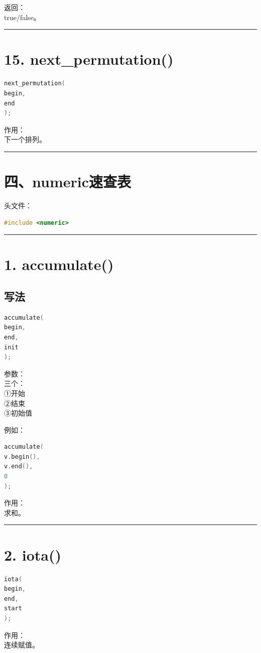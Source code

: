\documentclass[10pt,twocolumn]{extarticle}
\begin{document}
返回：\\
true/false。

\noindent\rule{\linewidth}{0.4pt}

\section{15. next\_permutation()}
\begin{lstlisting}[language=C++]
next_permutation(
begin,
end
);
\end{lstlisting}
作用：\\
下一个排列。

\noindent\rule{\linewidth}{0.4pt}

\section{四、numeric速查表}

头文件：
\begin{lstlisting}[language=C++]
#include <numeric>
\end{lstlisting}

\noindent\rule{\linewidth}{0.4pt}

\section{1. accumulate()}

\subsection{写法}
\begin{lstlisting}[language=C++]
accumulate(
begin,
end,
init
);
\end{lstlisting}
参数：\\
三个：\\
①开始\\
②结束\\
③初始值

例如：
\begin{lstlisting}[language=C++]
accumulate(
v.begin(),
v.end(),
0
);
\end{lstlisting}
作用：\\
求和。

\noindent\rule{\linewidth}{0.4pt}

\section{2. iota()}
\begin{lstlisting}[language=C++]
iota(
begin,
end,
start
);
\end{lstlisting}
作用：\\
连续赋值。
\end{document}
